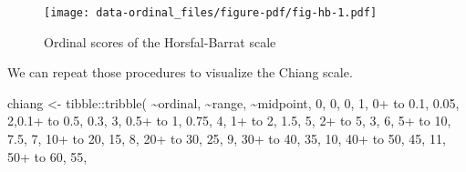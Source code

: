 \documentclass[
  letterpaper,
]{book}
\newenvironment{Shaded}{\begin{snugshade}}{\end{snugshade}}
\newcommand{\DecValTok}[1]{\textcolor[rgb]{0.68,0.00,0.00}{#1}}
\newcommand{\FloatTok}[1]{\textcolor[rgb]{0.68,0.00,0.00}{#1}}
\newcommand{\FunctionTok}[1]{\textcolor[rgb]{0.28,0.35,0.67}{#1}}
\newcommand{\NormalTok}[1]{\textcolor[rgb]{0.00,0.23,0.31}{#1}}
\newcommand{\OtherTok}[1]{\textcolor[rgb]{0.00,0.23,0.31}{#1}}
\newcommand{\SpecialCharTok}[1]{\textcolor[rgb]{0.37,0.37,0.37}{#1}}
\newcommand{\StringTok}[1]{\textcolor[rgb]{0.13,0.47,0.30}{#1}}
\begin{document}
\begin{figure}[H]

{\centering \texttt{[image: data-ordinal\_files/figure-pdf/fig-hb-1.pdf]}

}

\caption{\label{fig-hb}Ordinal scores of the Horsfal-Barrat scale}

\end{figure}

We can repeat those procedures to visualize the Chiang scale.

\begin{Shaded}
\begin{Highlighting}[]
\NormalTok{chiang }\OtherTok{\textless{}{-}}\NormalTok{ tibble}\SpecialCharTok{::}\FunctionTok{tribble}\NormalTok{(}
  \SpecialCharTok{\textasciitilde{}}\NormalTok{ordinal, }\SpecialCharTok{\textasciitilde{}}\StringTok{\textquotesingle{}range\textquotesingle{}}\NormalTok{, }\SpecialCharTok{\textasciitilde{}}\NormalTok{midpoint,}
  \DecValTok{0}\NormalTok{,          }\StringTok{\textquotesingle{}0\textquotesingle{}}\NormalTok{,     }\DecValTok{0}\NormalTok{,   }
  \DecValTok{1}\NormalTok{,  }\StringTok{\textquotesingle{}0+ to 0.1\textquotesingle{}}\NormalTok{,  }\FloatTok{0.05}\NormalTok{,   }
  \DecValTok{2}\NormalTok{,}\StringTok{\textquotesingle{}0.1+ to 0.5\textquotesingle{}}\NormalTok{,   }\FloatTok{0.3}\NormalTok{,   }
  \DecValTok{3}\NormalTok{,  }\StringTok{\textquotesingle{}0.5+ to 1\textquotesingle{}}\NormalTok{,  }\FloatTok{0.75}\NormalTok{,  }
  \DecValTok{4}\NormalTok{,    }\StringTok{\textquotesingle{}1+ to 2\textquotesingle{}}\NormalTok{,   }\FloatTok{1.5}\NormalTok{, }
  \DecValTok{5}\NormalTok{,    }\StringTok{\textquotesingle{}2+ to 5\textquotesingle{}}\NormalTok{,     }\DecValTok{3}\NormalTok{, }
  \DecValTok{6}\NormalTok{,   }\StringTok{\textquotesingle{}5+ to 10\textquotesingle{}}\NormalTok{,   }\FloatTok{7.5}\NormalTok{, }
  \DecValTok{7}\NormalTok{,  }\StringTok{\textquotesingle{}10+ to 20\textquotesingle{}}\NormalTok{,    }\DecValTok{15}\NormalTok{, }
  \DecValTok{8}\NormalTok{,  }\StringTok{\textquotesingle{}20+ to 30\textquotesingle{}}\NormalTok{,    }\DecValTok{25}\NormalTok{, }
  \DecValTok{9}\NormalTok{,  }\StringTok{\textquotesingle{}30+ to 40\textquotesingle{}}\NormalTok{,    }\DecValTok{35}\NormalTok{, }
  \DecValTok{10}\NormalTok{, }\StringTok{\textquotesingle{}40+ to 50\textquotesingle{}}\NormalTok{,    }\DecValTok{45}\NormalTok{,  }
  \DecValTok{11}\NormalTok{, }\StringTok{\textquotesingle{}50+ to 60\textquotesingle{}}\NormalTok{,    }\DecValTok{55}\NormalTok{,}

\end{Highlighting}
\end{Shaded}
\end{document}

